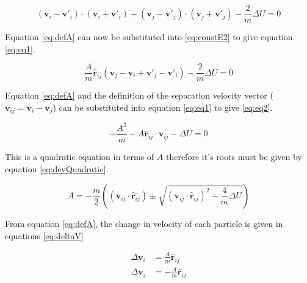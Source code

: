 \message{ !name(main.tex)}\documentclass[12pt]{UoAthesis}
\begin{document}
\begin{equation}
  \label{eq:constE2}
  (\mathbf{v}_i - \mathbf{v}'_i)\cdot(\mathbf{v}_i + \mathbf{v}'_i) +
  (\mathbf{v}_j - \mathbf{v}'_j)\cdot(\mathbf{v}_j + \mathbf{v}'_j) -
  \frac{2}{m}\Delta U = 0
\end{equation}

Equation \eqref{eq:defA} can now be substituted into
\eqref{eq:constE2} to give equation \eqref{eq:eq1}.

\begin{equation}
  \label{eq:eq1}
  \frac{A}{m}\mathbf{\hat{r}}_{ij} (\mathbf{v}_j - \mathbf{v}_i 
  + \mathbf{v}'_j - \mathbf{v}'_i) - \frac{2}{m}\Delta U = 0
\end{equation}

Equation \eqref{eq:defA} and the definition of the separation velocity
vector ($\mathbf{v}_{ij} = \mathbf{v}_i - \mathbf{v}_j$) can be
substituted into equation \eqref{eq:eq1} to give \eqref{eq:eq2}.

\begin{equation}
  \label{eq:eq2}
  -\frac{A^2}{m}
  -A\mathbf{\hat{r}}_{ij}\cdot\mathbf{v}_{ij} - \Delta U = 0
\end{equation}

This is a quadratic equation in terms of $A$ therefore it's roots must
be given by equation \eqref{eq:devQuadratic}.

\begin{equation}
  \label{eq:devQuadratic}
  A = -\frac{m}{2}\left((\mathbf{v}_{ij}\cdot\mathbf{\hat{r}}_{ij}) \pm
  \sqrt{(\mathbf{v}_{ij}\cdot\mathbf{\hat{r}}_{ij})^2 - \frac{4}{m}\Delta U}\right)
\end{equation}  

From equation \eqref{eq:defA}, the change in velocity of each particle
is given in equations \eqref{eq:deltaV}

\begin{subequations}
  \label{eq:deltaV}
  \begin{align}
    \Delta\mathbf{v}_i &= \frac{A}{m} \mathbf{\hat{r}}_{ij} \\
    \Delta\mathbf{v}_j &= -\frac{A}{m}\mathbf{\hat{r}}_{ij}    
  \end{align}
\end{subequations}
\end{document}
